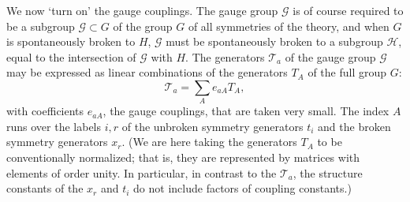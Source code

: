 We now `turn on' the gauge couplings. The gauge group $\mathcal G$ is of course required to be a subgroup $\mathcal G\subset G$ of the group $G$ of all symmetries of the theory, and when $G$ is spontaneously broken to $H$, $\mathcal G$ must be spontaneously broken to a subgroup $\mathcal H$, equal to the intersection of $\mathcal G$ with $H$. The generators $\mathcal T_a$ of the gauge group $\mathcal G$ may be expressed as linear combinations of the generators $T_A$ of the full group $G$:
\begin{equation}
\mathcal T_a=\sum_A e_{a A}T_A,
\tag{21.4.1}\label{eq:21.4.1}
\end{equation}
with coefficients $e_{a A}$, the gauge couplings, that are taken very small. The index $A$ runs over the labels $i,r$ of the unbroken symmetry generators $t_i$ and the broken symmetry generators $x_r$. (We are here taking the generators $T_A$ to be conventionally normalized; that is, they are represented by matrices with elements of order unity. In particular, in contrast to the $\mathcal T_a$, the structure constants of the $x_r$ and $t_i$ do not include factors of coupling constants.)

